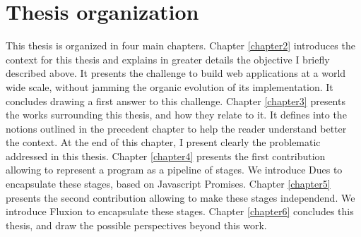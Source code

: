 \section{Thesis organization}

This thesis is organized in four main chapters.
Chapter \ref{chapter2} introduces the context for this thesis and explains in greater details the objective I briefly described above.
It presents the challenge to build web applications at a world wide scale, without jamming the organic evolution of its implementation.
It concludes drawing a first answer to this challenge.
Chapter \ref{chapter3} presents the works surrounding this thesis, and how they relate to it.
It defines into the notions outlined in the precedent chapter to help the reader understand better the context.
At the end of this chapter, I present clearly the problematic addressed in this thesis.
Chapter \ref{chapter4} presents the first contribution allowing to represent a program as a pipeline of stages.
We introduce Dues to encapsulate these stages, based on Javascript Promises.
Chapter \ref{chapter5} presents the second contribution allowing to make these stages independend.
We introduce Fluxion to encapsulate these stages.
Chapter \ref{chapter6} concludes this thesis, and draw the possible perspectives beyond this work.
